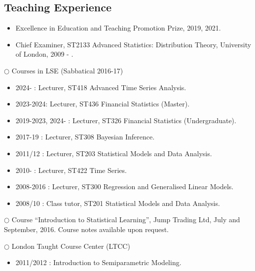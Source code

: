 \documentclass[overlapped,line,letterpaper]{res}
\begin{document}
\begin{resume}
\section{Teaching Experience}
\begin{itemize}
  \item[$\bullet$] Excellence in Education and Teaching Promotion Prize, 2019, 2021.
  \item[$\bullet$] Chief Examiner, ST2133 Advanced Statistics: Distribution Theory, University of London, 2009 - .
\end{itemize}
$\bigcirc$ Courses in LSE (Sabbatical 2016-17)
\begin{itemize}
\item[$\bullet$] 2024-    : Lecturer, ST418 Advanced Time Series Analysis. \\
\item[$\bullet$] 2023-2024: Lecturer, ST436 Financial Statistics (Master). \\
\item[$\bullet$] 2019-2023, 2024- : Lecturer, ST326 Financial Statistics (Undergraduate). \\
\item[$\bullet$] 2017-19 : Lecturer, ST308 Bayesian Inference.\\
\item[$\bullet$] 2011/12 : Lecturer, ST203 Statistical Models and Data Analysis.\\
\item[$\bullet$] 2010- : Lecturer, ST422 Time Series.\\
\item[$\bullet$] 2008-2016 : Lecturer, ST300 Regression and Generalised Linear
Models.\\
\item[$\bullet$] 2008/10 : Class tutor, ST201 Statistical Models and Data Analysis.
\end{itemize}

\vspace{12pt}
$\bigcirc$ Course ``Introduction to Statistical Learning'', Jump Trading Ltd, July and September, 2016. Course notes available upon request.


\vspace{12pt}
$\bigcirc$ London Taught Course Center (LTCC)
\begin{itemize}
  \item[$\bullet$] 2011/2012 : Introduction to Semiparametric Modeling.
\end{itemize}



\end{resume}
\end{document}
